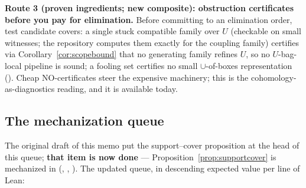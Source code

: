 \documentclass[11pt]{article}
\begin{document}
\textbf{Route 3 (proven ingredients; new composite): obstruction
certificates before you pay for elimination.}  Before committing to
an elimination order, test candidate covers: a single stuck
compatible family over $U$ (checkable on small witnesses; the
repository computes them exactly for the coupling family) certifies
via Corollary~\ref{cor:scopebound} that no generating family refines
$U$, so no $U$-bag-local pipeline is sound; a fooling set certifies
no small $\cup$-of-boxes representation
().  Cheap NO-certificates
steer the expensive machinery; this is the cohomology-as-diagnostics
reading, and it is available today.

\subsection{The mechanization queue}

The original draft of this memo put the support--cover proposition at
the head of this queue; \textbf{that item is now done} ---
Proposition~\ref{prop:supportcover} is mechanized in
(,
,
).  The updated
queue, in descending expected value per line of Lean:
\end{document}
